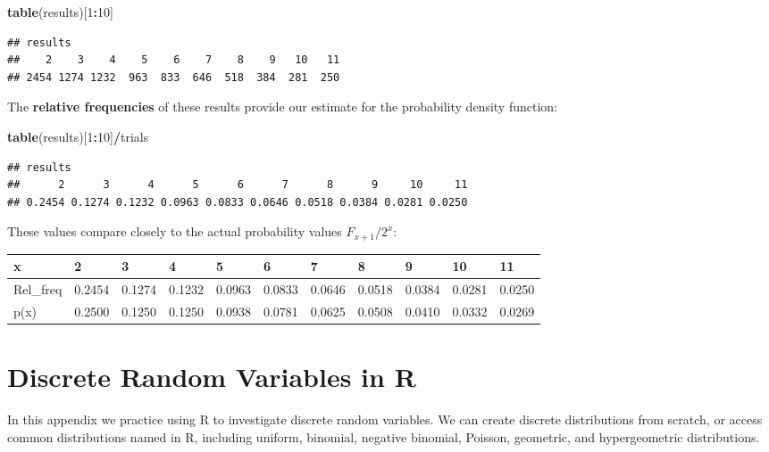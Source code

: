 \documentclass[
]{book}
\newenvironment{Shaded}{\begin{snugshade}}{\end{snugshade}}
\newcommand{\DecValTok}[1]{\textcolor[rgb]{0.00,0.00,0.81}{#1}}
\newcommand{\FunctionTok}[1]{\textcolor[rgb]{0.13,0.29,0.53}{\textbf{#1}}}
\newcommand{\NormalTok}[1]{#1}
\newcommand{\SpecialCharTok}[1]{\textcolor[rgb]{0.81,0.36,0.00}{\textbf{#1}}}
\theoremstyle{definition}
\theoremstyle{definition}
\theoremstyle{definition}
\theoremstyle{definition}
\theoremstyle{remark}
\begin{document}
\begin{Shaded}
\begin{Highlighting}[]
\FunctionTok{table}\NormalTok{(results)[}\DecValTok{1}\SpecialCharTok{:}\DecValTok{10}\NormalTok{]}
\end{Highlighting}
\end{Shaded}

\begin{verbatim}
## results
##    2    3    4    5    6    7    8    9   10   11 
## 2454 1274 1232  963  833  646  518  384  281  250
\end{verbatim}

The \textbf{relative frequencies} of these results provide our estimate for the probability density function:

\begin{Shaded}
\begin{Highlighting}[]
\FunctionTok{table}\NormalTok{(results)[}\DecValTok{1}\SpecialCharTok{:}\DecValTok{10}\NormalTok{]}\SpecialCharTok{/}\NormalTok{trials}
\end{Highlighting}
\end{Shaded}

\begin{verbatim}
## results
##      2      3      4      5      6      7      8      9     10     11 
## 0.2454 0.1274 0.1232 0.0963 0.0833 0.0646 0.0518 0.0384 0.0281 0.0250
\end{verbatim}

These values compare closely to the actual probability values \(F_{x+1}/2^x\):

\begin{table}
\centering
\begin{tabular}{l|l|l|l|l|l|l|l|l|l|l}
\hline
x & 2 & 3 & 4 & 5 & 6 & 7 & 8 & 9 & 10 & 11\\
\hline
Rel\_freq & 0.2454 & 0.1274 & 0.1232 & 0.0963 & 0.0833 & 0.0646 & 0.0518 & 0.0384 & 0.0281 & 0.0250\\
\hline
p(x) & 0.2500 & 0.1250 & 0.1250 & 0.0938 & 0.0781 & 0.0625 & 0.0508 & 0.0410 & 0.0332 & 0.0269\\
\hline
\end{tabular}
\end{table}

\chapter{Discrete Random Variables in R}\label{R-discreteRV}

In this appendix we practice using R to investigate discrete random variables. We can create discrete distributions from scratch, or access common distributions named in R, including uniform, binomial, negative binomial, Poisson, geometric, and hypergeometric distributions.
\end{document}
